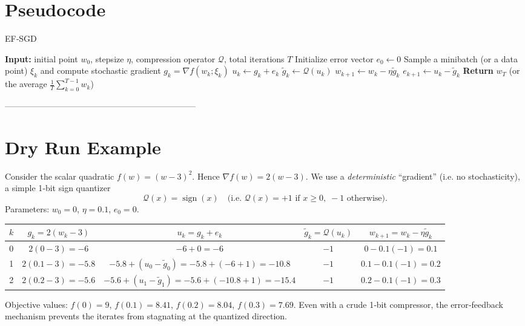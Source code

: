 \documentclass{article}
\begin{document}
\section*{Pseudocode}
\begin{algorithm}[H]
\caption{EF‑SGD}
\begin{algorithmic}[1]
\State \textbf{Input:} initial point $w_0$, stepsize $\eta$, compression operator $\mathcal{Q}$, total iterations $T$
\State Initialize error vector $e_0\gets 0$
    \State Sample a minibatch (or a data point) $\xi_k$ and compute stochastic gradient $g_k=\nabla f(w_k;\xi_k)$
    \State $u_k \gets g_k+e_k$ 
    \State $\tilde g_k \gets \mathcal{Q}(u_k)$ 
    \State $w_{k+1} \gets w_k - \eta \tilde g_k$ 
    \State $e_{k+1} \gets u_k-\tilde g_k$ 
\EndFor
\State \textbf{Return} $w_T$ (or the average $\frac1T\sum_{k=0}^{T-1} w_k$)
\end{algorithmic}
\end{algorithm}

--------------------------------------------------------------------

\section*{Dry Run Example}
Consider the scalar quadratic $f(w)=(w-3)^2$.  
Hence $\nabla f(w)=2(w-3)$.  
We use a \emph{deterministic} “gradient” (i.e. no stochasticity), a simple 1‑bit sign quantizer
\[
\mathcal{Q}(x)=\operatorname{sign}(x)\quad\text{(i.e. } \mathcal{Q}(x)=+1\text{ if }x\ge 0,\; -1\text{ otherwise)}.
\]
Parameters: $w_0=0$, $\eta=0.1$, $e_0=0$.

\begin{center}
\begin{tabular}{c|c|c|c|c}
$k$ & $g_k=2(w_k-3)$ & $u_k=g_k+e_k$ & $\tilde g_k=\mathcal{Q}(u_k)$ & $w_{k+1}=w_k-\eta\tilde g_k$\\\hline
0 & $2(0-3)=-6$ & $-6+0=-6$ & $-1$ & $0-0.1(-1)=0.1$\\
1 & $2(0.1-3)=-5.8$ & $-5.8+ (u_0-\tilde g_0)= -5.8+(-6+1)=-10.8$ & $-1$ & $0.1-0.1(-1)=0.2$\\
2 & $2(0.2-3)=-5.6$ & $-5.6+ (u_1-\tilde g_1)= -5.6+(-10.8+1)=-15.4$ & $-1$ & $0.2-0.1(-1)=0.3$
\end{tabular}
\end{center}
Objective values: $f(0)=9$, $f(0.1)=8.41$, $f(0.2)=8.04$, $f(0.3)=7.69$.  
Even with a crude 1‑bit compressor, the error‑feedback mechanism prevents the iterates from stagnating at the quantized direction.
\end{document}
